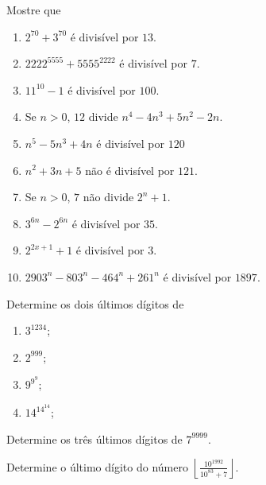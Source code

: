 \begin{questao}
  Mostre que
  \begin{enumerate}

    \item $2^{70}+3^{70}$ é divisível por $13$.

    \item ${2222}^{5555}+{5555}^{2222}$ é divisível por $7$.

    \item $11^{10}-1$ é divisível por $100$.

    \item Se $n>0$, $12$ divide $n^4-4n^3+5n^2-2n$.

    \item $n^5-5n^3+4n$ é divisível por $120$

    \item $n^2+3n+5$ não é divisível por $121$.

    \item Se $n>0$, $7$ não divide $2^n+1$.

    \item $3^{6n} - 2^{6n}$ é divisível por $35$.

    \item $2^{2x+1}+1$ é divisível por $3$.

    \item $2903^n-803^n-464^n+261^n$ é divisível por $1897$.
  \end{enumerate}
\end{questao}

\begin{questao}
  Determine os dois últimos dígitos de
  \begin{enumerate}

    \item $3^{1234}$;

    \item $2^{999}$;

    \item $9^{9^9}$;

    \item $14^{14^{14}}$;
  \end{enumerate}

\end{questao}

\begin{questao}
  Determine os três últimos dígitos de $7^{9999}$.
\end{questao}

\begin{questao}
  Determine o último dígito do número $ \left \lfloor
    \frac{10^{1992}}{10^{83}+7} \right \rfloor$.
\end{questao}

